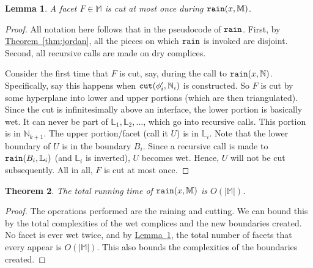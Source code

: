 \documentclass[11pt]{article}
\newcommand{\ignore}[1]{}
\newtheorem{theorem}{Theorem}
\newtheorem{lemma}[theorem]{Lemma}
\theoremstyle{definition}
\newcommand{\LL}{\mathbb{L}}
\newcommand{\MM}{\mathbb{M}}
\newcommand{\NN}{\mathbb{N}}
\newcommand{\Thm}[1]{\hyperref[thm:#1]{Theorem~\ref*{thm:#1}}} %
\newcommand{\Lem}[1]{\hyperref[lem:#1]{Lemma~\ref*{lem:#1}}} %
\newcommand{\cut}{{\tt cut}}
\newcommand{\lift}{{\tt lift}}
\newcommand{\rain}{{\tt rain}}
\begin{document}
\begin{lemma}\label{lem:new-verts}
A facet $F \in \MM$ is cut at most once during $\rain(x,\MM)$.
\end{lemma}
\begin{proof} All notation here follows that in the pseudocode of $\rain$.
First, by \Thm{jordan}, all the pieces on which $\rain$ is invoked are disjoint.
Second, all recursive calls are made on dry complices.

Consider the first time that $F$ is cut, say, during the call to $\rain(x,\NN)$.
Specifically, say this happens when $\cut(\phi'_i,\NN_i)$ is constructed. 
So $F$ is cut by some hyperplane into lower and upper portions (which are then triangulated).
Since the cut is infinitesimally above an interface, the lower portion is basically wet.
It can never be part of $\LL_1, \LL_2, \ldots$, which go into recursive calls. This portion
is in $\NN_{k+1}$. The upper portion/facet (call it $U$) is in $\LL_i$. Note that the lower
boundary of $U$ is in the boundary $B_i$. Since a recursive call is made to $\rain(B_i,\LL_i)$
(and $\LL_i$ is inverted), $U$ becomes wet. Hence, $U$ will not be cut subsequently.
All in all, $F$ is cut at most once.
\ignore{
As the number of edges is $O(n)$, arguing that there is at most one boundary vertex created along any given edge will imply the claim.
Consider some edge $e$ and take the first time a boundary vertex is created in $e$.
This happens when some contour $\phi$ intersects $e$. On applying $\cut(\NN,\lift(\phi))$,
consider the dry manifold $\LL$ and wet manifold $\MM$ constructed. The edge $e$ is split into two parts, the dry and wet part.
The wet part is in $\MM$ and will never be involved in any recursive call.

The dry part of $e$ (call it $e'$) needs to be considered.
A boundary vertex $v$ (an new endpoint of $e$) is created, which is part of the boundary $B$ in $\LL$,
such that $\rain(B,\LL)$ is called to the inverted $\LL$. In this call, since the water starts from $v$,
all of $e'$ becomes wet. So there is no further interface contour that can intersect this portion of $e'$.
}
\end{proof}


\begin{theorem} \label{thm:rain-time} The total running time of $\rain(x,\MM)$ is $O(|\MM|)$.
\end{theorem}

\begin{proof} The operations performed are the raining and cutting. We can bound this by the total
complexities of the wet complices and the new boundaries created. No facet is ever wet twice,
and by \Lem{new-verts}, the total number of facets that every appear is $O(|\MM|)$. This also 
bounds the complexities of the boundaries created.
\end{proof}
\end{document}
